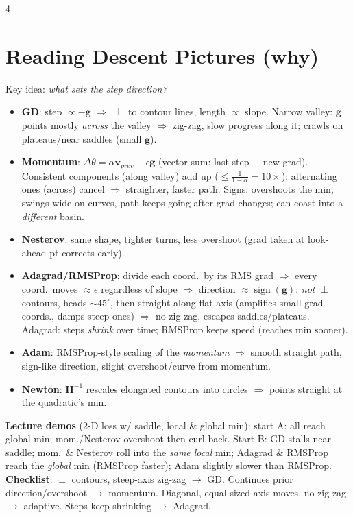 \documentclass[8pt,landscape]{extarticle}
\newcommand{\Hm}{\mathbf{H}}
\newcommand{\g}{\mathbf{g}}
\newcommand{\vv}{\mathbf{v}}
\newcommand{\sgn}{\operatorname{sign}}
\begin{document}
\begin{multicols*}{4}
\section{Reading Descent Pictures (why)}
Key idea: \emph{what sets the step direction?}
\begin{itemize}
\item \textbf{GD}: step $\propto-\g$ $\Rightarrow$ $\perp$ to contour lines, length $\propto$ slope. Narrow valley: $\g$ points mostly \emph{across} the valley $\Rightarrow$ zig-zag, slow progress along it; crawls on plateaus/near saddles (small $\g$).
\item \textbf{Momentum}: $\Delta\theta=\alpha\vv_{prev}-\epsilon\g$ (vector sum: last step + new grad). Consistent components (along valley) add up ($\le\frac{1}{1-\alpha}=10\times$); alternating ones (across) cancel $\Rightarrow$ straighter, faster path. Signs: overshoots the min, swings wide on curves, path keeps going after grad changes; can coast into a \emph{different} basin.
\item \textbf{Nesterov}: same shape, tighter turns, less overshoot (grad taken at look-ahead pt corrects early).
\item \textbf{Adagrad/RMSProp}: divide each coord.\ by its RMS grad $\Rightarrow$ every coord.\ moves $\approx\epsilon$ regardless of slope $\Rightarrow$ direction $\approx\sgn(\g)$: \emph{not} $\perp$ contours, heads $\sim45^\circ$, then straight along flat axis (amplifies small-grad coords., damps steep ones) $\Rightarrow$ no zig-zag, escapes saddles/plateaus. Adagrad: steps \emph{shrink} over time; RMSProp keeps speed (reaches min sooner).
\item \textbf{Adam}: RMSProp-style scaling of the \emph{momentum} $\Rightarrow$ smooth straight path, sign-like direction, slight overshoot/curve from momentum.
\item \textbf{Newton}: $\Hm^{-1}$ rescales elongated contours into circles $\Rightarrow$ points straight at the quadratic's min.
\end{itemize}
\textbf{Lecture demos} (2-D loss w/ saddle, local \& global min): start A: all reach global min; mom./Nesterov overshoot then curl back. Start B: GD stalls near saddle; mom.\ \& Nesterov roll into the \emph{same local} min; Adagrad \& RMSProp reach the \emph{global} min (RMSProp faster); Adam slightly slower than RMSProp.
\textbf{Checklist}: $\perp$ contours, steep-axis zig-zag $\to$ GD. Continues prior direction/overshoot $\to$ momentum. Diagonal, equal-sized axis moves, no zig-zag $\to$ adaptive. Steps keep shrinking $\to$ Adagrad.


\end{multicols*}
\end{document}

